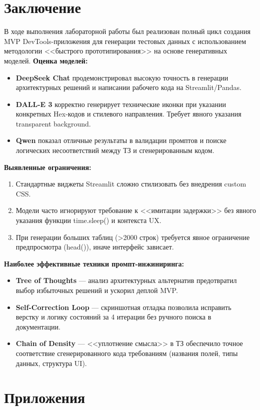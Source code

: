 \documentclass[oneside,a4paper,14pt]{extarticle}
\begin{document}
	\section*{Заключение}
	\noindent
	В ходе выполнения лабораторной работы был реализован полный цикл создания MVP DevTools-приложения для генерации тестовых данных с использованием методологии <<быстрого прототипирования>> на основе генеративных моделей.
	\noindent
	\textbf{Оценка моделей:}
	\begin{itemize}
		\item \textbf{DeepSeek Chat} продемонстрировал высокую точность в генерации архитектурных решений и написании рабочего кода на Streamlit/Pandas.
		\item \textbf{DALL-E 3} корректно генерирует технические иконки при указании конкретных Hex-кодов и стилевого направления. Требует явного указания transparent background.
		\item \textbf{Qwen} показал отличные результаты в валидации промптов и поиске логических несоответствий между ТЗ и сгенерированным кодом.
	\end{itemize}
	\noindent
	\textbf{Выявленные ограничения:}
	\begin{enumerate}
		\item Стандартные виджеты Streamlit сложно стилизовать без внедрения custom CSS.
		\item Модели часто игнорируют требование к <<имитации задержки>> без явного указания функции time.sleep() и контекста UX.
		\item При генерации больших таблиц (>2000 строк) требуется явное ограничение предпросмотра (head()), иначе интерфейс зависает.
	\end{enumerate}
	\noindent
	\textbf{Наиболее эффективные техники промпт-инжиниринга:}
	\begin{itemize}
		\item \textbf{Tree of Thoughts} --- анализ архитектурных альтернатив предотвратил выбор избыточных решений и ускорил деплой MVP.
		\item \textbf{Self-Correction Loop} --- скриншотная отладка позволила исправить верстку и логику состояний за 4 итерации без ручного поиска в документации.
		\item \textbf{Chain of Density} --- <<уплотнение смысла>> в ТЗ обеспечило точное соответствие сгенерированного кода требованиям (названия полей, типы данных, структура UI).
	\end{itemize}
	\newpage
	\section*{Приложения}
\end{document}
